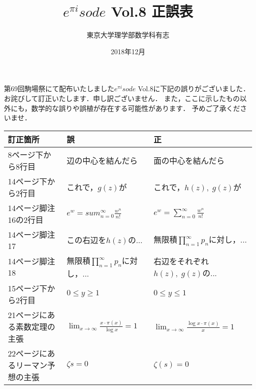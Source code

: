 \documentclass{jsarticle}
\title{$e^{\pi i}sode$ Vol.8 正誤表}
\date{2018年12月}
\author{東京大学理学部数学科有志}
\begin{document}
\maketitle

第69回駒場祭にて配布いたしました$e^{\pi i}sode$ Vol.8に下記の誤りがございました．
お詫びして訂正いたします．申し訳ございません．
また，ここに示したもの以外にも，数学的な誤りや誤植が存在する可能性があります．
予めご了承くださいませ．

\begin{table}[h]
\begin{center}
\begin{tabular}{lll}
訂正箇所&誤&正 \\\hline
8ページ下から8行目&辺の中心を結んだら&面の中心を結んだら \\
14ページ下から2行目&これで，$g(z)$が&これで，$h(z),\;g(z)$が \\
14ページ脚注16の2行目&$e^w=sum^\infty_{n=0}\frac{w^n}{n!}$&$e^w=\sum^\infty_{n=0}\frac{w^n}{n!}$ \\
14ページ脚注17&この右辺を$h(z)$の...&無限積$\prod_{n=1}^\infty p_n$に対し，... \\
14ページ脚注18&無限積$\prod_{n=1}^\infty p_n$に対し，...&右辺をそれぞれ$h(z),\;g(z)$の... \\
15ページ下から2行目&$0\leq y\geq 1$&$0\leq y\leq 1$ \\
21ページにある素数定理の主張&$\displaystyle\lim_{x\to\infty}\frac{x\cdot\pi(x)}{\log x}=1$&$\displaystyle\lim_{x\to\infty}\frac{\log x\cdot\pi(x)}{x}=1$ \\
22ページにあるリーマン予想の主張&$\zeta{s}=0$&$\zeta(s)=0$
\end{tabular}
\end{center}
\end{table}
\end{document}
